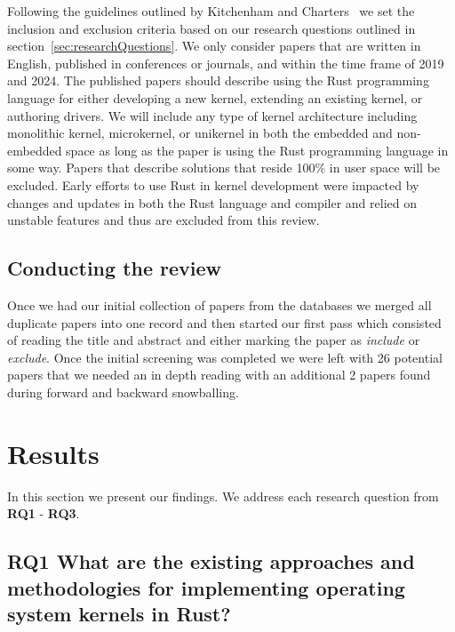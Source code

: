 \documentclass[sigconf,review,anonymous]{acmart}
\begin{document}
Following the guidelines outlined by Kitchenham and Charters~\cite{Stuart2007-cc} we set the
inclusion and exclusion criteria based on our research questions outlined in
section~\ref{sec:researchQuestions}. We only consider papers that are written in English, published
in conferences or journals, and within the time frame of 2019 and 2024. The published papers should
describe using the Rust programming language for either developing a new kernel, extending an
existing kernel, or authoring drivers. We will include any type of kernel architecture including
monolithic kernel, microkernel, or unikernel in both the embedded and non-embedded space as long as
the paper is using the Rust programming language in some way. Papers that describe solutions that
reside 100\% in user space will be excluded. Early efforts to use Rust in kernel development
were impacted by changes and updates in both the Rust language and compiler and relied on unstable
features and thus are excluded from this review.

\subsection{Conducting the review}

Once we had our initial collection of papers from the databases we merged all duplicate papers into
one record and then started our first pass which consisted of reading the title and abstract and
either marking the paper as \textit{include} or \textit{exclude}. Once the initial screening was
completed we were left with 26 potential papers that we needed an in depth reading with an
additional 2 papers found during forward and backward snowballing.

\section{Results}

In this section we present our findings. We address each research question from \textbf{RQ1} - \textbf{RQ3}.

\subsection{RQ1 What are the existing approaches and methodologies for implementing operating system kernels in Rust?}
\end{document}
